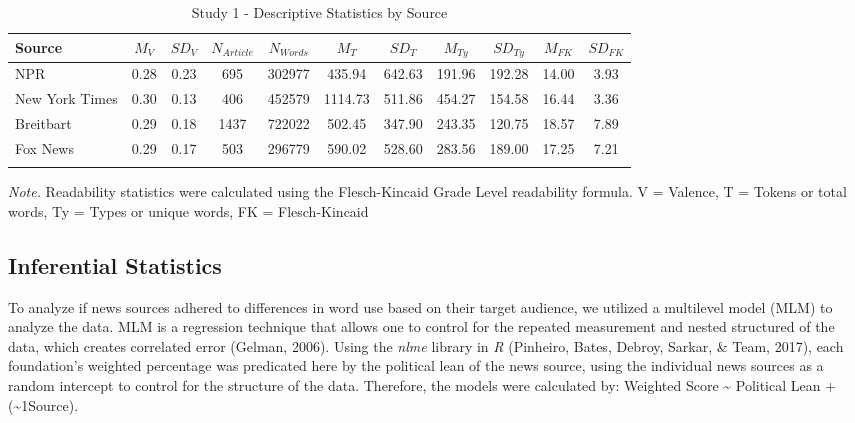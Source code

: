 \documentclass[
  man,floatsintext]{apa6}
\begin{document}
\begin{table}[h]

\begin{center}
\begin{threeparttable}

\caption{\label{tab:exp1-source-descriptives}Study 1 - Descriptive Statistics by Source}

\footnotesize{

\begin{tabular}{lcccccccccc}
\toprule
Source & $M_V$ & $SD_V$ & $N_{Article}$ & $N_{Words}$ & $M_T$ & $SD_T$ & $M_{Ty}$ & $SD_{Ty}$ & $M_{FK}$ & $SD_{FK}$\\
\midrule
NPR & 0.28 & 0.23 & 695 & 302977 & 435.94 & 642.63 & 191.96 & 192.28 & 14.00 & 3.93\\
New York Times & 0.30 & 0.13 & 406 & 452579 & 1114.73 & 511.86 & 454.27 & 154.58 & 16.44 & 3.36\\
Breitbart & 0.29 & 0.18 & 1437 & 722022 & 502.45 & 347.90 & 243.35 & 120.75 & 18.57 & 7.89\\
Fox News & 0.29 & 0.17 & 503 & 296779 & 590.02 & 528.60 & 283.56 & 189.00 & 17.25 & 7.21\\
\bottomrule
\addlinespace
\end{tabular}

}

\begin{tablenotes}[para]
\normalsize{\textit{Note.} Readability statistics were calculated using the Flesch-Kincaid Grade Level readability formula. V = Valence, T = Tokens or total words, Ty = Types or unique words, FK = Flesch-Kincaid}
\end{tablenotes}

\end{threeparttable}
\end{center}

\end{table}

\hypertarget{inferential-statistics}{%
\subsection{Inferential Statistics}\label{inferential-statistics}}

To analyze if news sources adhered to differences in word use based on their target audience, we utilized a multilevel model (MLM) to analyze the data. MLM is a regression technique that allows one to control for the repeated measurement and nested structured of the data, which creates correlated error (Gelman, 2006). Using the \emph{nlme} library in \emph{R} (Pinheiro, Bates, Debroy, Sarkar, \& Team, 2017), each foundation's weighted percentage was predicated here by the political lean of the news source, using the individual news sources as a random intercept to control for the structure of the data. Therefore, the models were calculated by: Weighted Score \textasciitilde{} Political Lean + (\textasciitilde1\textbar Source).
\end{document}
